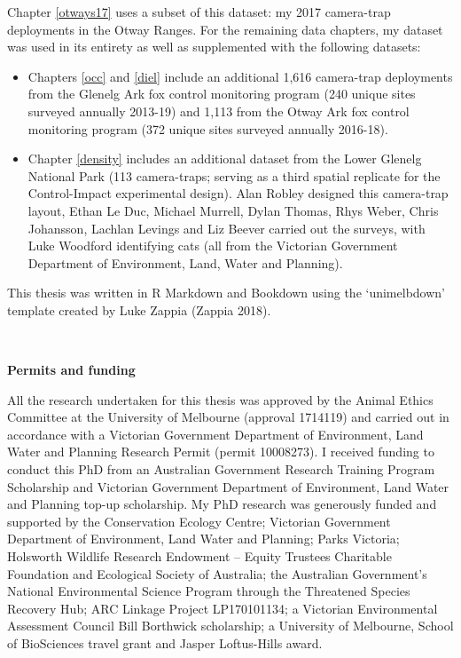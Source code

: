 \documentclass[11pt,a4paper,titlepage,twoside,openright]{style/unimelbthesis}
\begin{document}
\begin{frontmatter}
\begin{preface}
    Chapter \ref{otways17} uses a subset of this dataset: my 2017 camera-trap deployments in the Otway Ranges. For the remaining data chapters, my dataset was used in its entirety as well as supplemented with the following datasets:
    \begin{itemize}
    \item
      Chapters \ref{occ} and \ref{diel} include an additional 1,616 camera-trap deployments from the Glenelg Ark fox control monitoring program (240 unique sites surveyed annually 2013-19) and 1,113 from the Otway Ark fox control monitoring program (372 unique sites surveyed annually 2016-18).
    \item
      Chapter \ref{density} includes an additional dataset from the Lower Glenelg National Park (113 camera-traps; serving as a third spatial replicate for the Control-Impact experimental design). Alan Robley designed this camera-trap layout, Ethan Le Duc, Michael Murrell, Dylan Thomas, Rhys Weber, Chris Johansson, Lachlan Levings and Liz Beever carried out the surveys, with Luke Woodford identifying cats (all from the Victorian Government Department of Environment, Land, Water and Planning).
    \end{itemize}
    This thesis was written in R Markdown and Bookdown using the `unimelbdown' template created by Luke Zappia (Zappia 2018).

    \(~\)

    \textbf{Permits and funding}

    All the research undertaken for this thesis was approved by the Animal Ethics Committee at the University of Melbourne (approval 1714119) and carried out in accordance with a Victorian Government Department of Environment, Land Water and Planning Research Permit (permit 10008273). I received funding to conduct this PhD from an Australian Government Research Training Program Scholarship and Victorian Government Department of Environment, Land Water and Planning top-up scholarship. My PhD research was generously funded and supported by the Conservation Ecology Centre; Victorian Government Department of Environment, Land Water and Planning; Parks Victoria; Holsworth Wildlife Research Endowment -- Equity Trustees Charitable Foundation and Ecological Society of Australia; the Australian Government's National Environmental Science Program through the Threatened Species Recovery Hub; ARC Linkage Project LP170101134; a Victorian Environmental Assessment Council Bill Borthwick scholarship; a University of Melbourne, School of BioSciences travel grant and Jasper Loftus-Hills award.


\end{preface}
\end{frontmatter}
\end{document}
